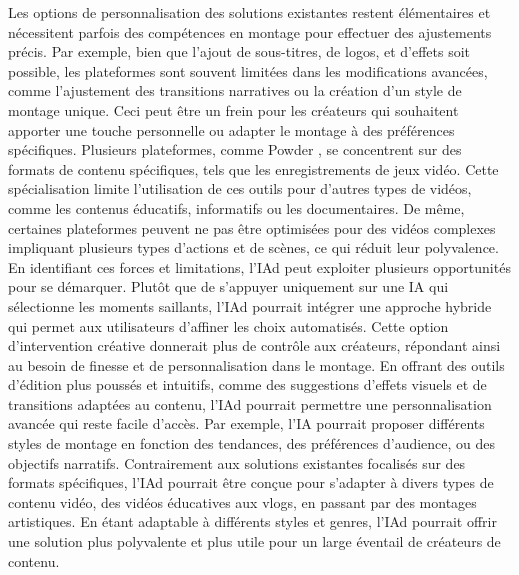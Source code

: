 \documentclass[livre]{udes-genie-these}
\begin{document}
Les options de personnalisation des solutions existantes restent élémentaires et nécessitent parfois des compétences en montage pour effectuer des ajustements précis. Par exemple, bien que l'ajout de sous-titres, de logos, et d'effets soit possible, les plateformes sont souvent limitées dans les modifications avancées, comme l'ajustement des transitions narratives ou la création d'un style de montage unique. Ceci peut être un frein pour les créateurs qui souhaitent apporter une touche personnelle ou adapter le montage à des préférences spécifiques.
Plusieurs plateformes, comme Powder \cite{powder2024}, se concentrent sur des formats de contenu spécifiques, tels que les enregistrements de jeux vidéo. Cette spécialisation limite l'utilisation de ces outils pour d'autres types de vidéos, comme les contenus éducatifs, informatifs ou les documentaires. De même, certaines plateformes peuvent ne pas être optimisées pour des vidéos complexes impliquant plusieurs types d'actions et de scènes, ce qui réduit leur polyvalence.
En identifiant ces forces et limitations, l'IAd peut exploiter plusieurs opportunités pour se démarquer. Plutôt que de s'appuyer uniquement sur une IA qui sélectionne les moments saillants, l'IAd pourrait intégrer une approche hybride qui permet aux utilisateurs d'affiner les choix automatisés. Cette option d'intervention créative donnerait plus de contrôle aux créateurs, répondant ainsi au besoin de finesse et de personnalisation dans le montage.
En offrant des outils d'édition plus poussés et intuitifs, comme des suggestions d'effets visuels et de transitions adaptées au contenu, l'IAd pourrait permettre une personnalisation avancée qui reste facile d'accès. Par exemple, l'IA pourrait proposer différents styles de montage en fonction des tendances, des préférences d'audience, ou des objectifs narratifs.
Contrairement aux solutions existantes focalisés sur des formats spécifiques, l'IAd pourrait être conçue pour s'adapter à divers types de contenu vidéo, des vidéos éducatives aux vlogs, en passant par des montages artistiques. En étant adaptable à différents styles et genres, l'IAd pourrait offrir une solution plus polyvalente et plus utile pour un large éventail de créateurs de contenu.
\end{document}

